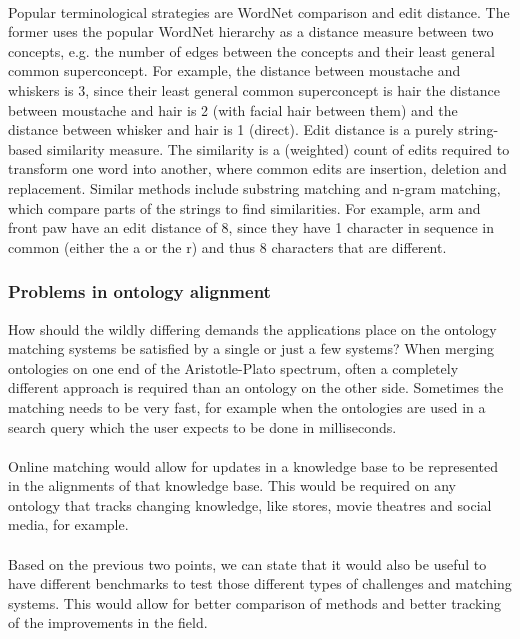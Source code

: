 \documentclass{article}
\begin{document}
 \paragraph{}
 Popular terminological strategies are WordNet comparison and edit distance. The former uses the popular WordNet hierarchy as a distance measure between two concepts, e.g. the number of edges between the concepts and their least general common superconcept\cite{lin2008}.
 For example, the distance between moustache and whiskers is 3, since their least general common superconcept is hair the distance between moustache and hair is 2 (with facial hair between them) and the distance between whisker and hair is 1 (direct).
 Edit distance is a purely string-based similarity measure. The similarity is a (weighted) count of edits required to transform one word into another, where common edits are insertion, deletion and replacement. Similar methods include substring matching and n-gram matching, which compare parts of the strings to find similarities\cite{singh2014, levenshtein}.
 For example, arm and front paw have an edit distance of 8, since they have 1 character in sequence in common (either the a or the r) and thus 8 characters that are different.
 \subsubsection{Problems in ontology alignment}
 How should the wildly differing demands the applications place on the ontology matching systems be satisfied by a single or just a few systems? When merging ontologies on one end of the Aristotle-Plato spectrum, often a completely different approach is required than an ontology on the other side. Sometimes the matching needs to be very fast, for example when the ontologies are used in a search query which the user expects to be done in milliseconds.
 \paragraph{}
 Online matching would allow for updates in a knowledge base to be represented in the alignments of that knowledge base. This would be required on any ontology that tracks changing knowledge, like stores, movie theatres and social media, for example.
 \paragraph{}
 Based on the previous two points, we can state that it would also be useful to have different benchmarks to test those different types of challenges and matching systems. This would allow for better comparison of methods and better tracking of the improvements in the field.
\end{document}
